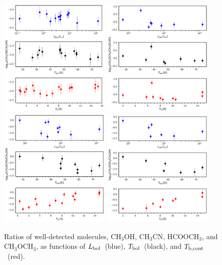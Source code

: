 \documentclass[twocolumn]{aastex62}
\newcommand{\lbol}{\mbox{$L_{\rm bol}$}}
\newcommand{\tbol}{\mbox{$T_{\rm bol}$}}
\newcommand{\tbc}{\mbox{$T_{\rm b, cont}$}}
\newcommand{\methylformate}{\mbox{HCOOCH$_{3}$}}
\newcommand{\methanol}{\mbox{CH$_{3}$OH}}
\newcommand{\dimethylether}{\mbox{CH$_{3}$OCH$_{3}$}}
\newcommand{\methylcyanide}{\mbox{CH$_{3}$CN}}
\begin{document}
\begin{figure}[htbp!]
  \centering
  \includegraphics[width=0.47\textwidth]{ratio_ch3cn_ch3oh.pdf}
  \includegraphics[width=0.47\textwidth]{ratio_ch3och3_ch3ocho.pdf}
  \includegraphics[width=0.47\textwidth]{ratio_ch3ocho_ch3oh.pdf}
  \includegraphics[width=0.47\textwidth]{ratio_ch3och3_ch3oh.pdf}
  \caption{Ratios of well-detected molecules, \methanol, \methylcyanide, \methylformate, and \dimethylether, as functions of \lbol\ (blue), \tbol\ (black), and \tbc\ (red).}
  \label{fig:ratios_indicators}
\end{figure}
\end{document}
